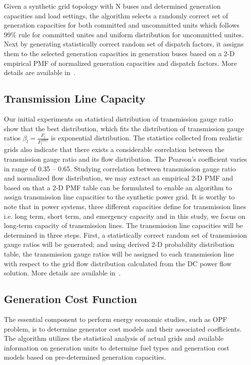 \documentclass[12pt]{article}
\numberwithin{equation}{section}
\numberwithin{table}{section}
\numberwithin{figure}{section}
\begin{document}
Given a synthetic grid topology with N buses and determined generation capacities and load settings, the algorithm selects a randomly correct set of generation capacities for both committed and uncommitted units which follows $99\%$ rule for committed unites and uniform distribution for uncommitted unites. Next by generating statistically correct random set of dispatch factors, it assigns them to the selected generation capacities in generation buses based on a 2-D empirical PMF of normalized generation capacities and dispatch factors. More details are available in~\cite{syngrid_transmissionline}.

\subsection{Transmission Line Capacity}

Our initial experiments on statistical distribution of transmission gauge ratio show that the best distribution, which fits the distribution of transmission gauge ratios $\beta_l =\frac{F_l}{F^{Max}_l}$ is exponential distribution. The statistics collected from realistic grids also indicate that there exists a considerable correlation between the transmission gauge ratio and its flow distribution. The Pearson's coefficient varies in range of 0.35 – 0.65. Studying correlation between transmission gauge ratio and normalized flow distribution, we may extract an empirical 2-D PMF and based on that a 2-D PMF table can be formulated to enable an algorithm to assign transmission line capacities to the synthetic power grid. It is worthy to note that in power systems, three different capacities define for transmission lines i.e. long term, short term, and emergency capacity and in this study, we focus on long-term capacity of transmission lines. The transmission line capacities will be determined in three steps. First, a statistically correct random set of transmission gauge ratios will be generated; and using derived 2-D probability distribution table, the transmission gauge ratios will be assigned to each transmission line with respect to the grid flow distribution calculated from the DC power flow solution. More details are available in~\cite{syngrid_transmissionline}.

\subsection{Generation Cost Function}

The essential component to perform energy economic studies, such as OPF problem, is to determine generator cost models and their associated coefficients. The algorithm utilizes the statistical analysis of actual grids and available information on generation units to determine fuel types and generation cost models based on pre-determined generation capacities.
\end{document}
